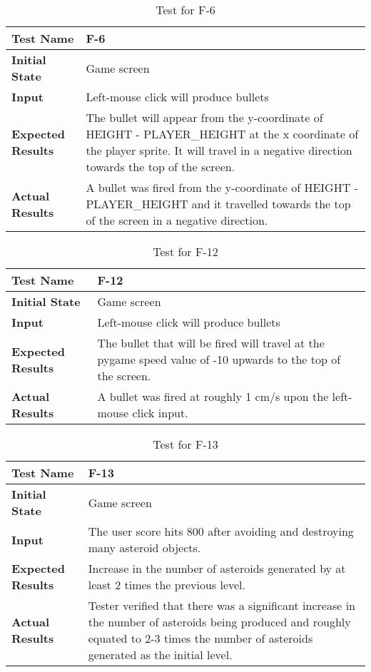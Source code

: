 \documentclass[12pt, titlepage]{article}
\begin{document}
\begin{table}[!htbp]
\begin{tabular}[r]{|l|l|}\hline
\textbf{Test Name} & F-6 \\ \hline
\textbf{Initial State} &   Game screen\\ \hline
\textbf{Input} &Left-mouse click will produce bullets \\ \hline 
\textbf{Expected Results} &The bullet will appear from the y-coordinate of HEIGHT - PLAYER\_HEIGHT at the x coordinate of the player sprite. It will travel in a negative direction towards the top of the screen. \\ \hline
\textbf{Actual Results} & A bullet was fired from the y-coordinate of HEIGHT - PLAYER\_HEIGHT  and it travelled towards the top of the screen in a negative direction.\\ \hline            
\end{tabular}
\caption{Test for F-6}
\label{Table}
\end{table}

\begin{table}[!htbp]
\begin{tabular}[r]{|l|l|}\hline
\textbf{Test Name} & F-12 \\ \hline
\textbf{Initial State} &   Game screen\\ \hline
\textbf{Input} &Left-mouse click will produce bullets \\ \hline 
\textbf{Expected Results} &The bullet that will be fired will travel at the pygame speed value of -10 upwards to the top of the screen. \\ \hline
\textbf{Actual Results} & A bullet was fired at roughly 1 cm/s upon the left-mouse click input.\\ \hline            
\end{tabular}
\caption{Test for F-12}
\label{Table}
\end{table}

\begin{table}[!htbp]
\begin{tabular}[r]{|l|l|}\hline
\textbf{Test Name} & F-13 \\ \hline
\textbf{Initial State} &   Game screen\\ \hline
\textbf{Input} &The user score hits 800 after avoiding and destroying many asteroid objects. \\ \hline 
\textbf{Expected Results} &Increase in the number of asteroids generated by at least 2 times the previous level.  \\ \hline
\textbf{Actual Results} & Tester verified that there was a significant increase in the number of asteroids being produced and roughly equated to 2-3 times the number of asteroids generated as the initial level.\\ \hline            
\end{tabular}
\caption{Test for F-13}
\label{Table}
\end{table}
\end{document}

